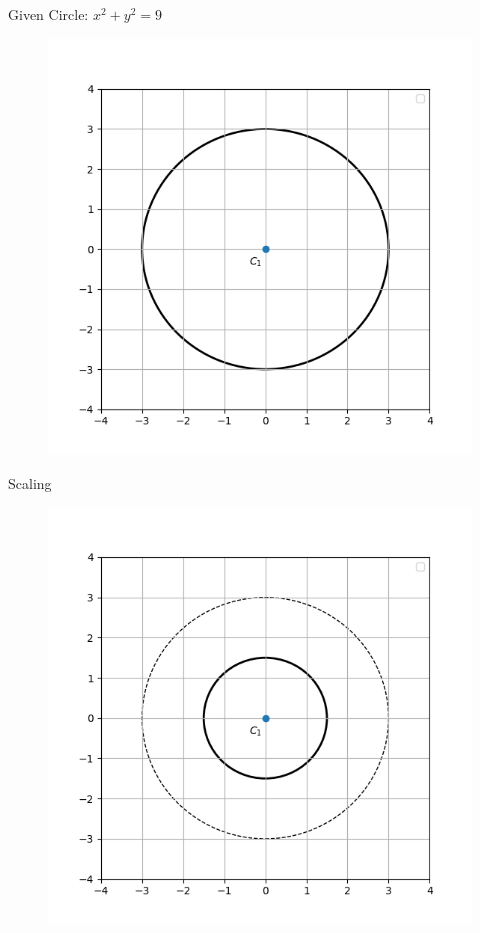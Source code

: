 \documentclass[10pt]{beamer}
\begin{document}
\begin{frame}{Given Circle:  \(x^2 + y^2 = 9\)}
  \begin{figure}[h]
\includegraphics[scale = 0.50]{s2_im1_show_original.png}

\end{figure}   
\end{frame}

\begin{frame}{Scaling}
     \begin{figure}[h]
\includegraphics[scale = 0.50]{s2_im3_show_scaling.png}

\end{figure}
\end{frame}
\end{document}
